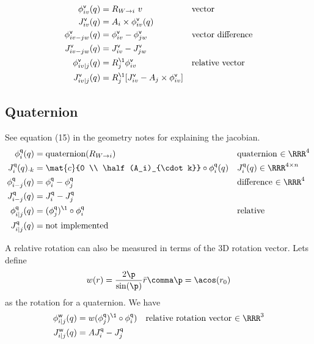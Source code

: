 \documentclass[10pt,fleqn,twoside]{article}
\newcommand{\rotvec}{{\textsf{w}}}
\newcommand{\veC}{{\textsf{v}}}
\newcommand{\quat}{{\textsf{q}}}
\newcommand{\RO}[2]{R_{{#1}\rightarrow{#2}}}
\begin{document}
\begin{align}
\phi^\veC_{iv}(q)
 &= \RO{W}{i}~ v
 && \text{vector} \\
J^\veC_{iv}(q)
 &= A_i\times \phi^\veC_{iv}(q) \\
\phi^\veC_{iv-jw}(q)
 &= \phi^\veC_{iv} - \phi^\veC_{jw}
 && \text{vector difference} \\
J^\veC_{iv-jw}(q)
 &= J^\veC_{iv} - J^\veC_{jw} \\
\phi^\veC_{iv|j}(q)
 &= R_j^\1 \phi^\veC_{iv}
 && \text{relative vector} \\
J^\veC_{iv|j}(q)
 &= R_j^\1 [J^\veC_{iv} - A_j \times \phi^\veC_{iv}]
\end{align}


\subsection{Quaternion}

See equation (15) in the geometry notes for explaining the jacobian.
\begin{align}
\phi^\quat_{i}(q)
 &= \text{quaternion}(\RO{W}{i})
 && \text{quaternion $\in\RRR^4$} \\
J^\quat_{i}(q)_{\cdot k}
 &= \mat{c}{0 \\ \half (A_i)_{\cdot k}} \circ \phi^\quat_{i}(q)
 && J^\quat_{i}(q)\in\RRR^{4 \times n} \\
\phi^\quat_{i-j}(q)
 &= \phi^\quat_{i} - \phi^\quat_{j}
 && \text{difference $\in\RRR^4$} \\
J^\quat_{i-j}(q)
 &= J^\quat_{i} - J^\quat_{j} \\
\phi^\quat_{i|j}(q)
 &= (\phi^\quat_{j})^\1 \circ \phi^\quat_{i}
 && \text{relative} \\
J^\quat_{i|j}(q)
 &= \text{not implemented}
\end{align}

A relative rotation can also be measured in terms of the 3D rotation
vector. Lets define
$$w(r) = \frac{2 \p}{\sin(\p)} \bar r \comma
\p=\acos(r_0)$$
as the rotation for a quaternion. We have
\begin{align}
\phi^\rotvec_{i|j}(q)
 &= w(\phi^\quat_{j})^\1 \circ \phi^\quat_{i})
 && \text{relative rotation vector $\in\RRR^3$} \\
J^\rotvec_{i|j}(q)
 &= AJ^\quat_{i} - J^\quat_{j} \\
\end{align}
\end{document}
